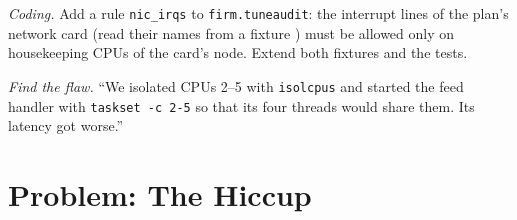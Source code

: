 \begin{exercise}[$\star\star\star$]\label{exo:ll:linux-tuning:7}
\emph{Coding.} Add a rule \texttt{nic\_irqs} to \texttt{firm.tuneaudit}: the interrupt lines of the plan's network card (read
their names from a fixture ) must be allowed only on housekeeping CPUs of the card's node. Extend both
fixtures and the tests.
\end{exercise}

\begin{exercise}[$\star\star\star$]\label{exo:ll:linux-tuning:8}
\emph{Find the flaw.} ``We isolated CPUs 2--5 with \texttt{isolcpus} and started the feed handler with \texttt{taskset -c 2-5}
so that its four threads would share them. Its latency got worse.''
\end{exercise}

\section{Problem: The Hiccup}

